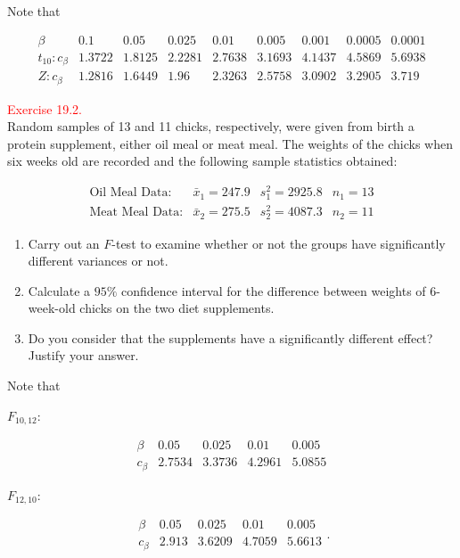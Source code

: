 \documentclass[
]{book}
\providecommand{\tightlist}{%
  \setlength{\itemsep}{0pt}\setlength{\parskip}{0pt}}
\begin{document}
Note that

\[ \begin{array}{c|c|c|c|c|c|c|c|c} \beta & 0.1 & 0.05 & 0.025 & 0.01 & 0.005 & 0.001 & 0.0005  & 0.0001 \\
\hline t_{10}: c_\beta & 1.3722 & 1.8125 & 2.2281 & 2.7638 & 3.1693 & 4.1437 & 4.5869 & 5.6938 \\  Z: c_\beta & 1.2816 & 1.6449 & 1.96 & 2.3263 & 2.5758 & 3.0902 & 3.2905 & 3.719 \end{array}  \]

\hfill\break

\hypertarget{exer19.2}{}
\textcolor{red}{Exercise 19.2.}\\
Random samples of 13 and 11 chicks, respectively, were given from birth a protein supplement, either oil meal or meat meal. The weights of the chicks when six weeks old are recorded and the following sample statistics obtained:

\[
\begin{array}{llll}
\mbox{Oil Meal Data:}  & \bar{x}_1= 247.9 & s_1^2 = 2925.8 & n_1 = 13\\
\mbox{Meat Meal Data:} & \bar{x}_2= 275.5 & s_2^2 = 4087.3 & n_2 = 11
\end{array}
\]

\begin{enumerate}
\def\labelenumi{(\alph{enumi})}
\tightlist
\item
  Carry out an \(F\)-test to examine whether or not the groups have significantly different variances or not.\\
\item
  Calculate a \(95\%\) confidence interval for the difference between weights of 6-week-old chicks on the two diet supplements.\\
\item
  Do you consider that the supplements have a significantly different effect? Justify your answer.
\end{enumerate}

Note that

\(F_{10,12}\):

\[ \begin{array}{c|c|c|c|c} \beta & 0.05 & 0.025 & 0.01 & 0.005  \\
\hline c_\beta & 2.7534 & 3.3736 & 4.2961 & 5.0855 \end{array}  \]

\(F_{12,10}\):

\[ \begin{array}{c|c|c|c|c} \beta & 0.05 & 0.025 & 0.01 & 0.005  \\
\hline c_\beta & 2.913 & 3.6209 & 4.7059 & 5.6613 \end{array}.  \]
\end{document}
